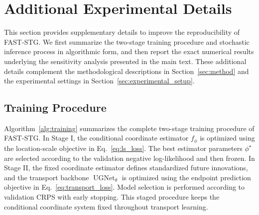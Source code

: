 \documentclass[sigconf, anonymous, review]{acmart}
\begin{document}
\section{Additional Experimental Details}
\label{app:experimental_details}

This section provides supplementary details to improve the
reproducibility of FAST-STG. We first summarize the two-stage training
procedure and stochastic inference process in algorithmic form, and
then report the exact numerical results underlying the sensitivity
analysis presented in the main text. These additional details
complement the methodological descriptions in Section~\ref{sec:method}
and the experimental settings in Section~\ref{sec:experimental_setup}.

\subsection{Training Procedure}
\label{app:training_procedure}

Algorithm~\ref{alg:training} summarizes the complete two-stage training
procedure of FAST-STG. In Stage I, the conditional coordinate estimator
$f_{\phi}$ is optimized using the location-scale objective in
Eq.~\eqref{eq:ls_loss}. The best estimator parameters
$\phi^{\star}$ are selected according to the validation negative
log-likelihood and then frozen. In Stage II, the fixed coordinate
estimator defines standardized future innovations, and the transport
backbone $\operatorname{UGNet}_{\theta}$ is optimized using the endpoint
prediction objective in Eq.~\eqref{eq:transport_loss}. Model selection
is performed according to validation CRPS with early stopping. This
staged procedure keeps the conditional coordinate system fixed
throughout transport learning.
\end{document}

